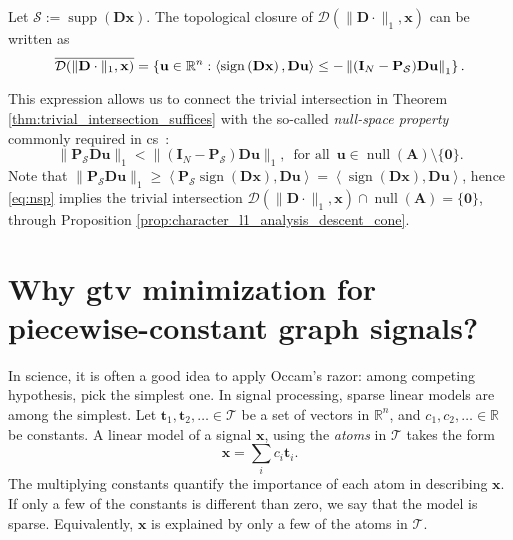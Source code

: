 \begin{proposition}\label{prop:character_l1_analysis_descent_cone}
    Let $\mathcal{S} := \operatorname{supp}\left ( \mathbf{Dx} \right )$. The topological closure of $\mathcal{D}(\| \mathbf{D} \cdot \|_1, \mathbf{x})$ can be written as
    \begin{equation}
        \mathop{\overline{\mathcal{D}(\| \mathbf{D} \cdot \|_1, \mathbf{x})}} = \left\{ \mathbf{u} \in \mathbb{R}^{n} : \left\langle \operatorname{sign} \left ( \mathbf{Dx} \right ), \mathbf{Du} \right\rangle \leq -\left\|(\mathbf{I}_N - \mathbf{P}_{\mathcal{S}}) \mathbf{Du}\right\|_1 \right\}.
    \end{equation}
\end{proposition}

This expression allows us to connect the trivial intersection in Theorem \ref{thm:trivial_intersection_suffices} with the so-called \emph{null-space property} commonly required in \acrlong{cs}~\cite[Ch. 4]{foucart2013}:
\begin{equation}
    \|\mathbf{P}_{\mathcal{S}} \mathbf{Du}\|_1 < \|(\mathbf{I}_N - \mathbf{P}_{\mathcal{S}}) \mathbf{Du}\|_1, \enspace \text{for all} \enspace \mathbf{u} \in \operatorname{null} \left ( \mathbf{A} \right ) \setminus \{\mathbf{0}\}.
    \label{eq:nsp}
\end{equation}
Note that $\| \mathbf{P}_{\mathcal{S}} \mathbf{Du}\|_1 \geq \left\langle \mathbf{P}_{\mathcal{S}}\operatorname{sign} \left ( \mathbf{Dx} \right ), \mathbf{Du} \right\rangle = \left\langle \operatorname{sign} \left ( \mathbf{Dx} \right ), \mathbf{Du} \right\rangle$, hence \eqref{eq:nsp} implies the trivial intersection $\mathcal{D}(\| \mathbf{D} \cdot \|_1, \mathbf{x}) \cap \operatorname{null} \left ( \mathbf{A} \right ) = \{\mathbf{0}\}$, through Proposition \ref{prop:character_l1_analysis_descent_cone}.


\section{Why \texorpdfstring{\acrshort{gtv}}{G-TV} minimization for piecewise-constant graph signals?}

In science, it is often a good idea to apply Occam's razor: among competing hypothesis, pick the simplest one. In signal processing, sparse linear models are among the simplest. Let $\mathbf{t}_1, \mathbf{t}_2, \dots \in \mathcal{T}$ be a set of vectors in $\mathbb{R}^{n}$, and $c_1, c_2, \dots \in \mathbb{R}$ be constants. A linear model of a signal $\mathbf{x}$, using the \emph{atoms} in $\mathcal{T}$ takes the form
\begin{equation}\label{eq:linear_model}
    \mathbf{x} = \sum_{i} c_i \mathbf{t}_i.
\end{equation}
The multiplying constants quantify the importance of each atom in describing $\mathbf{x}$. If only a few of the constants is different than zero, we say that the model is sparse. Equivalently, $\mathbf{x}$ is explained by only a few of the atoms in $\mathcal{T}$.

